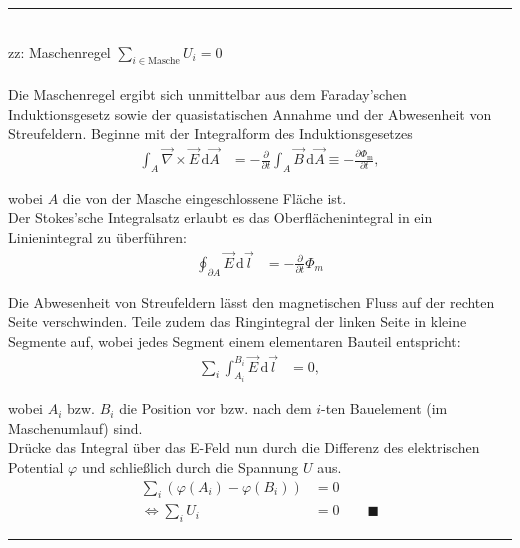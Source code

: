 \documentclass{article}
\newcommand{\diff}{\mathrm{d}}
\begin{document}
\newpage


{\color{violet}
\hrule
	\\
	zz: Maschenregel $\sum_{i \in \text{Masche}} U_i = 0$\\
	\\
	Die Maschenregel ergibt sich unmittelbar aus dem Faraday'schen Induktionsgesetz sowie der quasistatischen Annahme und der Abwesenheit von Streufeldern. Beginne mit der Integralform des Induktionsgesetzes
		\begin{align*}
			\int_A \vec{\nabla} \times \vec{E} \, \diff \vec{A} &= - \frac{\partial}{\partial t} \int_A \vec{B} \, \diff \vec{A} \equiv -\frac{\partial\Phi_\text{m}}{\partial t},
		\end{align*}
	
	wobei $A$ die von der Masche eingeschlossene Fläche ist.\\
	Der Stokes'sche Integralsatz erlaubt es das Oberflächenintegral in ein Linienintegral zu überführen:
		\begin{align*}
			\oint_{\partial A} \vec{E} \, \diff \vec{l} &= -\frac{\partial}{\partial t} \Phi_m
		\end{align*}
	
	Die Abwesenheit von Streufeldern lässt den magnetischen Fluss auf der rechten Seite verschwinden. Teile zudem das Ringintegral der linken Seite in kleine Segmente auf, wobei jedes Segment einem elementaren Bauteil entspricht:
		\begin{align*}
			\sum_i \int_{A_i}^{B_i} \vec{E} \, \diff \vec{l} &= 0,
		\end{align*}
	
	wobei $A_i$ bzw. $B_i$ die Position vor bzw. nach dem $i$-ten Bauelement (im Maschenumlauf) sind.\\	
	Drücke das Integral über das E-Feld nun durch die Differenz des elektrischen Potential $\varphi$ und schließlich durch die Spannung $U$ aus.
		\begin{align*}
			\sum_i (\varphi(A_i) - \varphi(B_i)) &= 0 \\
			\Leftrightarrow \sum_i U_i &= 0 \qquad \blacksquare
		\end{align*}
\hrule
}


\newpage
\end{document}
